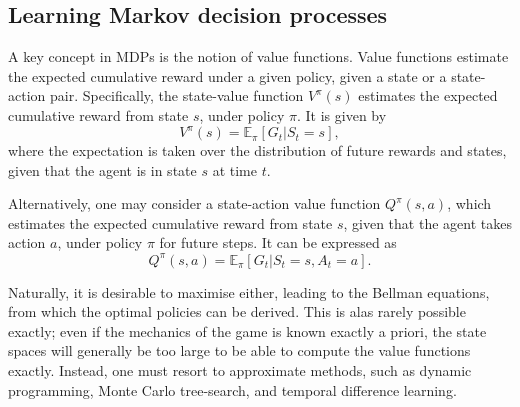 \subsection{Learning Markov decision processes}
\label{sec:learning-mdps}
A key concept in MDPs is the notion of value functions.
Value functions estimate the expected cumulative reward under a given policy, given a state or a state-action pair.
Specifically, the state-value function $V^{\pi}(s)$ estimates the expected cumulative reward from state $s$, under policy $\pi$.
It is given by
\begin{equation}
    V^{\pi}(s) = \mathbb{E}_\pi \left[ G_t | S_t = s \right],
\end{equation}
where the expectation is taken over the distribution of future rewards and states, given that the agent is in state $s$ at time $t$.

Alternatively, one may consider a state-action value function $Q^{\pi}(s, a)$, which estimates the expected cumulative reward from state $s$, given that the agent takes action $a$, under policy $\pi$ for future steps.
It can be expressed as
\begin{equation}
    Q^{\pi}(s, a) = \mathbb{E}_\pi \left[ G_t | S_t = s, A_t = a \right].
\end{equation}

Naturally, it is desirable to maximise either, leading to the Bellman equations, from which the optimal policies can be derived.
This is alas rarely possible exactly; even if the mechanics of the game is known exactly a priori\footnotemark, the state spaces will generally be too large to be able to compute the value functions exactly.
Instead, one must resort to approximate methods, such as dynamic programming, Monte Carlo tree-search, and temporal difference learning.


